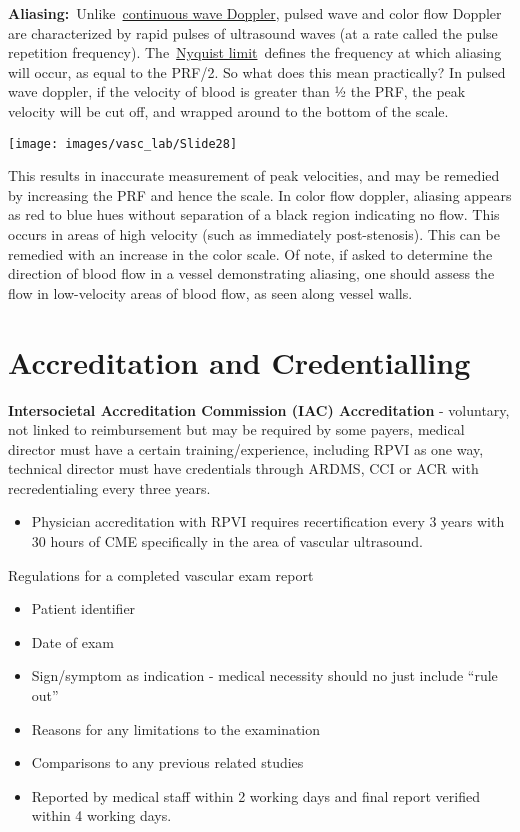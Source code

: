 \documentclass[
]{book}
\providecommand{\tightlist}{%
  \setlength{\itemsep}{0pt}\setlength{\parskip}{0pt}}
\begin{document}
\textbf{Aliasing:}~Unlike~\href{https://radiopaedia.org/articles/continuous-wave-doppler?lang=us}{continuous wave
Doppler},
pulsed wave and color flow Doppler are characterized by rapid pulses of
ultrasound waves (at a rate called the pulse repetition frequency).
The~\href{https://radiopaedia.org/articles/nyquist-limit?lang=us}{Nyquist
limit}~defines
the frequency at which aliasing will occur, as equal to the PRF/2. So
what does this mean practically? In pulsed wave doppler, if the velocity
of blood is greater than ½ the PRF, the peak velocity will be cut off,
and wrapped around to the bottom of the scale.

\texttt{[image: images/vasc\_lab/Slide28]}

This results in inaccurate measurement of peak velocities, and may be
remedied by increasing the PRF and hence the scale. In color flow
doppler, aliasing appears as red to blue hues without separation of a
black region indicating no flow. This occurs in areas of high velocity
(such as immediately post-stenosis). This can be remedied with an
increase in the color scale. Of note, if asked to determine the
direction of blood flow in a vessel demonstrating aliasing, one should
assess the flow in low-velocity areas of blood flow, as seen along
vessel walls.

\hypertarget{accreditation-and-credentialling}{%
\section{Accreditation and Credentialling}\label{accreditation-and-credentialling}}

\textbf{Intersocietal Accreditation Commission (IAC) Accreditation} -
voluntary, not linked to reimbursement but may be required by some
payers, medical director must have a certain training/experience,
including RPVI as one way, technical director must have credentials
through ARDMS, CCI or ACR with recredentialing every three
years.\citep{iac2021}

\begin{itemize}
\tightlist
\item
  Physician accreditation with RPVI requires recertification every 3
  years with 30 hours of CME specifically in the area of vascular
  ultrasound.
\end{itemize}

Regulations for a completed vascular exam report\citep{iac2021}

\begin{itemize}
\item
  Patient identifier
\item
  Date of exam
\item
  Sign/symptom as indication - medical necessity should no just
  include ``rule out''
\item
  Reasons for any limitations to the examination
\item
  Comparisons to any previous related studies
\item
  Reported by medical staff within 2 working days and final report
  verified within 4 working days.
\end{itemize}
\end{document}
